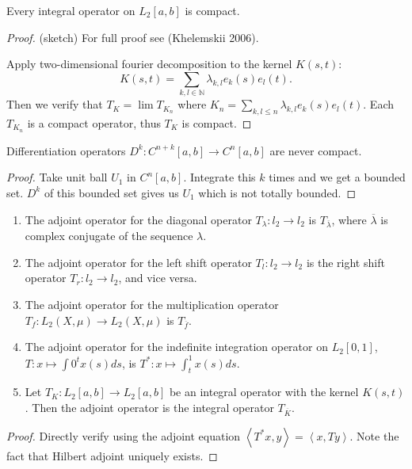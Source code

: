 \begin{theorem}
	\label{prop:IntegralOperatorCompact}
	Every integral operator on $L_2[a,b]$ is compact.
\end{theorem}
\begin{proof}
	(sketch) For full proof see (Khelemskii 2006).

	Apply two-dimensional fourier decomposition to the kernel $K(s, t)$:
	\[
		K(s, t) = \sum_{k, l \in \mathbb{N}} \lambda_{k, l} e_k(s) e_l(t)
	.\] 
	Then we verify that $T_K = \lim T_{K_n}$ where $K_n = \sum_{k, l \le n} \lambda_{k, l} e_k(s) e_l(t)$. Each $T_{K_n}$ is a compact operator, thus $T_K$ is compact.
\end{proof}


\begin{proposition}
	\label{prop:DifferentiationNotCompact}
	Differentiation operators $D^k : C^{n + k}[a,b] \to C^n[a,b]$ are never compact. 
\end{proposition}
\begin{proof}
	Take unit ball $U_1$ in $C^n[a,b]$. Integrate this $k$ times and we get a bounded set. $D^k$ of this bounded set gives us $U_1$ which is not totally bounded.
\end{proof}


\begin{proposition}
	\label{prop:ExAdjoint}
	\begin{enumerate}
		\item The adjoint operator for the diagonal operator $T_\lambda: l_2 \to l_2$ is $T_{\overline{\lambda} }$, where $\overline{\lambda} $ is complex conjugate of the sequence $\lambda$.
		\item The adjoint operator for the left shift operator $T_l: l_2 \to l_2$ is the right shift operator $T_r: l_2 \to l_2$, and vice versa.
		\item The adjoint operator for the multiplication operator $T_f: L_2(X, \mu) \to L_2(X, \mu)$ is $T_{\overline{f} }$.
		\item The adjoint operator for the indefinite integration operator on $L_2[0,1]$, $T: x \mapsto \int 0^t x(s) ds$, is $T^*: x \mapsto \int _t^1 x(s) d s$.
		\item Let $T_K:L_2[a,b] \to L_2[a,b]$ be an integral operator with the kernel $K(s, t)$. Then the adjoint operator is the integral operator $T_{\overline{K} }$.
	\end{enumerate}
\end{proposition}
\begin{proof}
	Directly verify using the adjoint equation $\left\langle T^* x, y \right\rangle  = \left\langle x, Ty \right\rangle $. Note the fact that Hilbert adjoint uniquely exists.
\end{proof}



